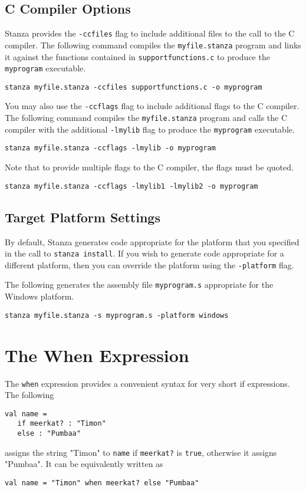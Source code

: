 \documentclass[10pt,oneside]{book}
\begin{document}
\subsection*{C Compiler Options}
Stanza provides the \texttt{\frenchspacing -ccfiles} flag to include additional files to the call to the C compiler. The following command compiles the \texttt{\frenchspacing myfile.stanza} program and links it against the functions contained in \texttt{\frenchspacing supportfunctions.c} to produce the \texttt{\frenchspacing myprogram} executable.
\begin{lstlisting}
stanza myfile.stanza -ccfiles supportfunctions.c -o myprogram
\end{lstlisting}

You may also use the \texttt{\frenchspacing -ccflags} flag to include additional flags to the C compiler. The following command compiles the \texttt{\frenchspacing myfile.stanza}  program and calls the C compiler with the additional \texttt{\frenchspacing -lmylib} flag to produce the \texttt{\frenchspacing myprogram} executable.
\begin{lstlisting}
stanza myfile.stanza -ccflags -lmylib -o myprogram
\end{lstlisting}

Note that to provide multiple flags to the C compiler, the flags must be quoted.
\begin{lstlisting}
stanza myfile.stanza -ccflags -lmylib1 -lmylib2 -o myprogram
\end{lstlisting}

\subsection*{Target Platform Settings}
By default, Stanza generates code appropriate for the platform that you specified in the call to \texttt{\frenchspacing stanza install}. If you wish to generate code appropriate for a different platform, then you can override the platform using the \texttt{\frenchspacing -platform} flag.

The following generates the assembly file \texttt{\frenchspacing myprogram.s} appropriate for the Windows platform.
\begin{lstlisting}
stanza myfile.stanza -s myprogram.s -platform windows
\end{lstlisting}

\section{The When Expression}
The \texttt{\frenchspacing when} expression provides a convenient syntax for very short if expressions. The following
\begin{lstlisting}
val name =
   if meerkat? : "Timon"
   else : "Pumbaa"
\end{lstlisting}
assigns the string "Timon" to \texttt{\frenchspacing name} if \texttt{\frenchspacing meerkat?} is \texttt{\frenchspacing true}, otherwise it assigns "Pumbaa". It can be equivalently written as
\begin{lstlisting}
val name = "Timon" when meerkat? else "Pumbaa"
\end{lstlisting}
\end{document}
